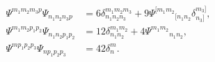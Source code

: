 \begin{equation}
\begin{aligned}
   \Psi^{m_1m_2m_3p}\Psi_{n_1n_2n_3p}
      &= 6\delta^{m_1m_2m_3}_{n_1n_2n_3} +9 \Psi^{[m_1m_2}{}_{[n_1n_2}
      \delta^{m_3]}_{n_3]} , \\
   \Psi^{m_1m_2p_1p_2}\Psi_{n_1n_2p_1p_2}
      &= 12\delta^{m_1m_2}_{n_1n_2} +4 \Psi^{m_1m_2}{}_{n_1n_2} , \\
   \Psi^{mp_1p_2p_3}\Psi_{np_1p_2p_3}
      &= 42\delta^{m}_{n} . 
\end{aligned}
\end{equation}

